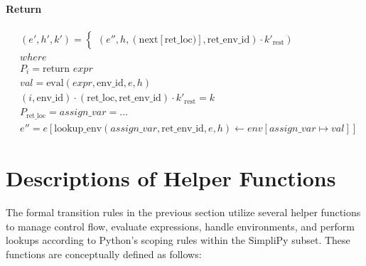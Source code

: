 \documentclass[runningheads]{llncs}
\newcommand{\lit}[1]{\textit{#1}}
\newcommand{\state}[3]{(#1, #2, #3)} %
\newcommand{\context}[2]{(#1, #2)} %
\newcommand{\lookupenv}{\text{lookup\_env}}
\newcommand{\evalexpr}{\text{eval}}
\begin{document}
\paragraph{Return}
\begin{displaymath}
	\begin{aligned}
		 & \state{e'}{h'}{k'} =
		\begin{cases*}
			\state{e''}{h}{\context{\text{next}[\text{ret\_loc})]}{\text{ret\_env\_id}} \cdot k'_{\text{rest}}}
		\end{cases*}
		\\
		 & where                                                                                                           \\
		 & P_{i} = \text{return } expr                                                                                     \\
		 & val = \evalexpr(\lit{expr}, \text{env\_id}, e, h)                                                               \\
		 & \context{i}{\text{env\_id}} \cdot \context{\text{ret\_loc}}{\text{ret\_env\_id}} \cdot k'_{\text{rest}} = k     \\
		 & P_{\text{ret\_loc}} = assign\_var = \ldots                                                                      \\
		 & e'' = e[\lookupenv(\lit{assign\_var}, \text{ret\_env\_id}, e, h) \leftarrow env[\lit{assign\_var} \mapsto val]]
	\end{aligned}
\end{displaymath}

\section*{Descriptions of Helper Functions}

The formal transition rules in the previous section utilize several helper
functions to manage control flow, evaluate expressions, handle environments, and
perform lookups according to Python's scoping rules within the SimpliPy subset.
These functions are conceptually defined as follows:
\end{document}
